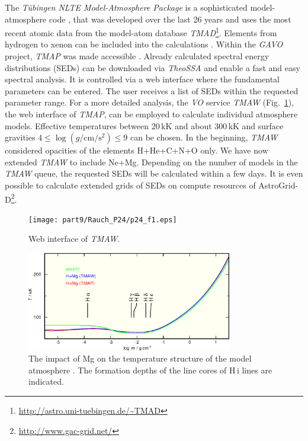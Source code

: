 The \emph{T\"ubingen NLTE Model-Atmosphere Package} 
\citep[\emph{TMAP},][]{werneretal2003, rauchdeetjen2003} is a 
sophisticated model-atmosphere code 
\citep[e.g\@.][]{rauchetal2007},
that was developed over the last 26 years 
and uses the most recent atomic data from the model-atom database
\emph{TMAD}\footnote[1]{\url{http://astro.uni-tuebingen.de/~TMAD}}.
Elements from hydrogen to xenon can be included into the calculations 
\citep{rauch2003,werneretal2012,rauchetal2012}. 
Within the \emph{GAVO} project, \emph{TMAP} was made accessible \citep{rauchringat2011}.
Already calculated spectral energy distributions
(SEDs) can be downloaded via \emph{TheoSSA} and enable a fast and 
easy spectral analysis. It is controlled via a web interface where the fundamental 
parameters can be entered. The user receives a list of SEDs within the requested 
parameter range. For a more detailed analysis, the \emph{VO} service \emph{TMAW} (Fig.~\ref{fig:tmaw}), the 
web interface of \emph{TMAP}, can be employed to calculate individual atmosphere models. 
Effective temperatures between 20\,kK and about 300\,kK and surface gravities
$4 \leq \log (g / \mathrm{cm/s^2}) \leq 9$ can be chosen.
In the beginning,  \emph{TMAW} considered opacities of the elements H+He+C+N+O only.
We have now extended \emph{TMAW} to include Ne+Mg.
Depending on the number of models in the \emph{TMAW} queue, the requested SEDs 
will be calculated within a few days. It is even possible to calculate
extended grids of SEDs on compute resources of AstroGrid-D\footnote[2]{\url{http://www.gac-grid.net/}}.


\begin{landscape}
\begin{figure}[ht!]\centering
\texttt{[image: part9/Rauch\_P24/p24\_f1.eps]}
\caption{Web interface of \emph{TMAW}.}
\label{fig:tmaw}
\end{figure}
\end{landscape}


\begin{figure}[ht!]\centering
\includegraphics[width=0.8\textwidth]{part9/Rauch_P24/p24_f2.eps}
\caption{The impact of Mg on the temperature structure of the model atmosphere
         \citep[$T_\mathrm{eff}=60\,\mathrm{kK}$, $\log g = 7$, solar abundances,][]{asplundetal2009}.
         The formation depths of the line cores of H\,{\sc i} lines are indicated.}
\label{fig:Tstruc}
\end{figure}


